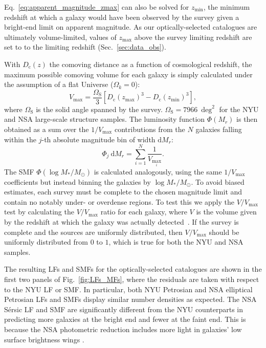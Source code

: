 \documentclass[usenatbib,useAMS]{mnras}
\begin{document}
Eq.~\eqref{eq:apparent_magnitude_zmax} can also be solved for $z_{\min}$, the minimum redshift at which a galaxy would have been observed by the survey given a bright-end limit on apparent magnitude. As our optically-selected catalogues are ultimately volume-limited, values of $z_{\max}$ above the survey limiting redshift are set to to the limiting redshift (Sec.~\ref{sec:data_obs}).

With $D_{\mathrm{c}}(z)$ the comoving distance as a function of cosmological redshift, the maximum possible comoving volume for each galaxy is simply calculated under the assumption of a flat Universe ($\Omega_k = 0$):
%
\begin{equation}\label{eq:vmax}
    V_{\max}
    =
    \frac{\Omega_{\mathrm{S}}} {3}
    \left[ D_\mathrm{c} (z_{\max})^3 - D_\mathrm{c} (z_{\min})^3 \right],
\end{equation}
%
where $\Omega_{\mathrm{S}}$ is the solid angle spanned by the survey. $\Omega_{\mathrm{S}} = 7966~\deg^2$ for the \ac{NYU} and \ac{NSA} large-scale structure samples. The luminosity function $\Phi(M_r)$ is then obtained as a sum over the $1/V_{\max}$ contributions from the $N$ galaxies falling within the $j$-th absolute magnitude bin of width $\mathrm{d} M_r$:
%
\begin{equation}\label{eq:differential_luminosity_function}
    \Phi_j \: \mathrm{d} M_r
    =
    \sum_{i=1}^{N} \frac{1}{V_{{\max}_i}}.
\end{equation}
%
The \acl{SMF} $\Phi (\log M_*/M_\odot)$ is calculated analogously, using the same $1/V_{\max}$ coefficients but instead binning the galaxies by $\log M_*/M_\odot$. To avoid biased estimates, each survey must be complete to the chosen magnitude limit and contain no notably under- or overdense regions. To test this we apply the $V/V_{\max}$ test by calculating the $V/V_{\max}$ ratio for each galaxy, where $V$ is the volume given by the redshift at which the galaxy was actually detected~\citep{Schidt:1968}. If the survey is complete and the sources are uniformly distributed, then $V / V_{\max}$ should be uniformly distributed from $0$ to $1$, which is true for both the \ac{NYU} and \ac{NSA} samples.

The resulting \acp{LF} and \acp{SMF} for the optically-selected catalogues are shown in the first two panels of Fig.~\ref{fig:LFs_MFs}, where the residuals are taken with respect to the \ac{NYU} \ac{LF} or \ac{SMF}. In particular, both \ac{NYU} Petrosian and \ac{NSA} elliptical Petrosian \acp{LF} and \acp{SMF} display similar number densities as expected. The \ac{NSA} S\'ersic \ac{LF} and \ac{SMF} are significantly different from the \ac{NYU} counterparts in predicting more galaxies at the bright end and fewer at the faint end. This is because the NSA photometric reduction includes more light in galaxies' low surface brightness wings \citep{Blanton_subtraction}.
\end{document}

